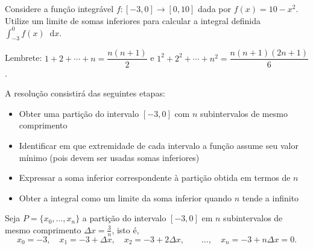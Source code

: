 \documentclass[12pt,a4paper]{article}
\newcommand*\diff{\mathop{}\!\mathrm{d}}
\begin{document}
\begin{ExerciseList}
\Exercise[title={2,5}] Considere a função integrável $f:[-3, 0] \to [0, 10]$ dada por $f(x) = 10 - x^2$. Utilize um limite de somas inferiores para calcular a integral definida $\int_{-3}^0 f(x) \diff{x}$.

\begin{center}
Lembrete:
\(
  1 + 2 + \cdots + n = \dfrac{n(n+1)}{2}
\)
e
\(
  1^2 + 2^2 + \cdots + n^2 = \dfrac{n(n+1)(2n+1)}{6}
\)
.
\end{center}
\Answer A resolução consistirá das seguintes etapas:
\begin{itemize}
  \item Obter uma partição do intervalo $[-3, 0]$ com $n$ subintervalos de mesmo comprimento
  \item Identificar em que extremidade de cada intervalo a função assume seu valor mínimo (pois devem ser usadas somas inferiores)
  \item Expressar a soma inferior correspondente à partição obtida em termos de $n$
  \item Obter a integral como um limite da soma inferior quando $n$ tende a infinito
\end{itemize}

Seja $P = \{ x_0, \ldots, x_n \}$ a partição do intervalo $[-3, 0]$ em $n$ subintervalos de mesmo comprimento $\Delta x = \frac{3}{n}$, isto é,
\[
  x_0 = -3,\quad
  x_1 = -3 + \Delta x,\quad
  x_2 = -3 + 2\Delta x,\quad
  \quad\ldots,\quad
  x_n = -3 + n\Delta x = 0.
\]


\end{ExerciseList}
\end{document}
